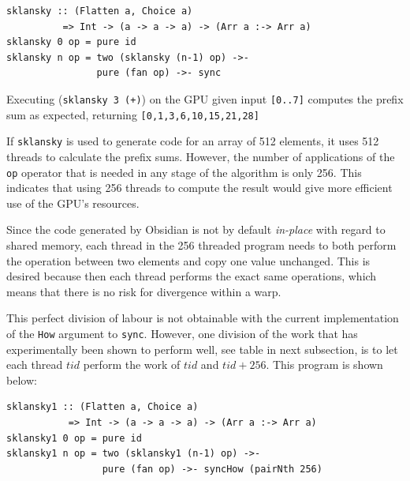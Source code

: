 \begin{small}
\begin{verbatim}
sklansky :: (Flatten a, Choice a) 
          => Int -> (a -> a -> a) -> (Arr a :-> Arr a) 
sklansky 0 op = pure id
sklansky n op = two (sklansky (n-1) op) ->- 
                pure (fan op) ->- sync
\end{verbatim}
\end{small}

Executing ({\tt sklansky 3 (+)}) on the GPU given input {\tt [0..7]} computes
the prefix sum as expected, returning {\tt [0,1,3,6,10,15,21,28]} 


If {\tt sklansky} is used to generate code for an array of 512 elements,
it uses 512 threads to calculate the prefix sums. However, the number of 
applications of the {\tt op} operator that is needed in any stage of the 
algorithm is only 256. This indicates that 
using 256 threads to compute the result would give more efficient
use of the GPU's resources.

Since the code generated by Obsidian is not by default {\em in-place} with regard 
to shared memory, each thread in the 256 threaded program needs to both perform 
the operation between two elements and copy one value unchanged. This is desired
because then each thread performs the exact same operations,
which means that there is no risk for divergence within a warp. 

This perfect division of labour is not obtainable with the current 
implementation of the {\tt How} argument to {\tt sync}. However, one 
division of the work that has experimentally been shown to perform well, see 
table in next subsection,  
is to let each thread $tid$ perform the work of $tid$ and $tid + 256$. This 
program is shown below: 

\begin{small}
\begin{verbatim}
sklansky1 :: (Flatten a, Choice a) 
           => Int -> (a -> a -> a) -> (Arr a :-> Arr a) 
sklansky1 0 op = pure id
sklansky1 n op = two (sklansky1 (n-1) op) ->- 
                 pure (fan op) ->- syncHow (pairNth 256) 
\end{verbatim}
\end{small}


